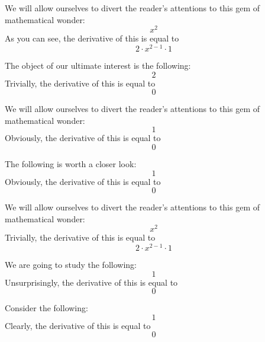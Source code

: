 \documentclass{article}
\begin{document}
We will allow ourselves to divert the reader's attentions to this gem of mathematical wonder:
\begin{equation}
x ^{2 } 
\end{equation}
As you can see, the derivative of this is equal to
\begin{equation}
2 \cdot x ^{2 - 1 } \cdot 1 
\end{equation}

The object of our ultimate interest is the following:
\begin{equation}
2 
\end{equation}
Trivially, the derivative of this is equal to
\begin{equation}
0 
\end{equation}

We will allow ourselves to divert the reader's attentions to this gem of mathematical wonder:
\begin{equation}
1 
\end{equation}
Obviously, the derivative of this is equal to
\begin{equation}
0 
\end{equation}

The following is worth a closer look:
\begin{equation}
1 
\end{equation}
Obviously, the derivative of this is equal to
\begin{equation}
0 
\end{equation}

We will allow ourselves to divert the reader's attentions to this gem of mathematical wonder:
\begin{equation}
x ^{2 } 
\end{equation}
Trivially, the derivative of this is equal to
\begin{equation}
2 \cdot x ^{2 - 1 } \cdot 1 
\end{equation}

We are going to study the following:
\begin{equation}
1 
\end{equation}
Unsurprisingly, the derivative of this is equal to
\begin{equation}
0 
\end{equation}

Consider the following:
\begin{equation}
1 
\end{equation}
Clearly, the derivative of this is equal to
\begin{equation}
0 
\end{equation}
\end{document}

